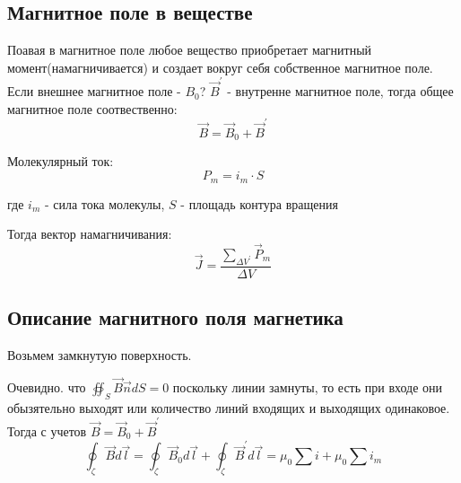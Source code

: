 \documentclass[../main.tex]{subfiles}
\begin{document}
\subsection{Магнитное поле в веществе}
Поавая в магнитное поле любое вещество приобретает магнитный момент(намагничивается) и создает вокруг себя собственное магнитное поле. Если внешнее магнитное поле - $B_0$?
$\vec B^{\prime}$ - внутренне магнитное поле, тогда общее магнитное поле соотвественно: 
\[\vec B = \vec B_0 + \vec B^{\prime}\]

Молекулярный ток: 
\[P_m = i_m \cdot S\]
\begin{center}
    где $i_m$ - сила тока молекулы, $S$ - площадь контура вращения
\end{center}
Тогда вектор намагничивания: 
\[\vec J = \frac{\sum_{\Delta V^{\prime}} \vec P_m}{\Delta V}\]

\subsection{Описание магнитного поля магнетика}
Возьмем замкнутую поверхность. 

Очевидно. что $\oiint_{S} \vec B \vec n dS = 0$ поскольку линии замнуты, то есть при входе они обызятельно выходят или количество линий входящих и выходящих одинаковое.
Тогда с учетов $\vec B = \vec B_0 + \vec B^{\prime}$
\[\oint_{\zeta} \vec B d \vec l = \oint_{\zeta} \vec B_0 d \vec l  + \oint_{\zeta} \vec B^{\prime} d \vec l = \mu_0 \sum i + \mu_0 \sum i_m \]
\end{document}
